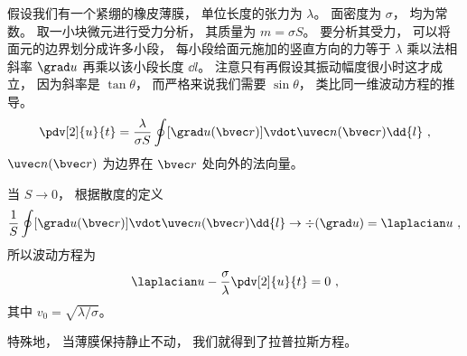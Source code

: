 
\begin{issues}
\issueDraft
\end{issues}


假设我们有一个紧绷的橡皮薄膜， 单位长度的张力为 $\lambda$。 面密度为 $\sigma$， 均为常数。 取一小块微元进行受力分析， 其质量为 $m = \sigma S$。 要分析其受力， 可以将面元的边界划分成许多小段， 每小段给面元施加的竖直方向的力等于 $\lambda$ 乘以法相斜率 $\grad u$ 再乘以该小段长度 $\dd{l}$。 注意只有再假设其振动幅度很小时这才成立， 因为斜率是 $\tan\theta$， 而严格来说我们需要 $\sin\theta$， 类比同一维波动方程的推导。
\begin{equation}
\pdv[2]{u}{t} = \frac{\lambda}{\sigma S}\oint [\grad u(\bvec r)] \vdot \uvec n(\bvec r) \dd{l}~,
\end{equation}
$\uvec n(\bvec r)$ 为边界在 $\bvec r$ 处向外的法向量。

当 $S \to 0$， 根据散度的定义
\begin{equation}
\frac{1}{S} \oint [\grad u(\bvec r)] \vdot \uvec n(\bvec r) \dd{l} \to \div (\grad u) = \laplacian u~,
\end{equation}
所以波动方程为
\begin{equation}
\laplacian u - \frac{\sigma}{\lambda}\pdv[2]{u}{t} = 0~,
\end{equation}
其中 $v_0 = \sqrt{\lambda/\sigma}$。

特殊地， 当薄膜保持静止不动， 我们就得到了拉普拉斯方程。
